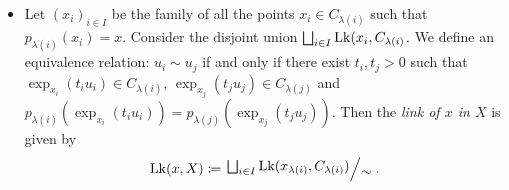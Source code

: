 \begin{defin}
\begin{itemize}
  \item Let \((x_i)_{i \in I}\) be the family of all the points \(x_i \in C_{\lambda(i)}\) such that \(p_{\lambda(i)}(x_i) = x\). Consider the disjoint union \(\bigsqcup_{i \in I} \operatorname{Lk}(x_i, C_{\lambda(i)}\). We define an equivalence relation: \(u_i \sim u_j\) if and only if there exist \(t_i, t_j > 0\) such that \(\exp_{x_i}(t_i u_i) \in C_{\lambda(i)}\), \(\exp_{x_j}(t_j u_j) \in C_{\lambda(j)}\) and \(p_{\lambda(i)}(\exp_{x_i}(t_i u_i)) = p_{\lambda(j)}(\exp_{x_j}(t_j u_j))\). Then the \emph{link of \(x\) in \(X\)} is given by
    \begin{align*}
      \lk(x, X) \coloneqq \quot{\bigsqcup_{i \in I} \lk(x_{\lambda(i)}, C_{\lambda(i)})}{\sim}.
    \end{align*}
  \end{itemize}
\end{defin}


